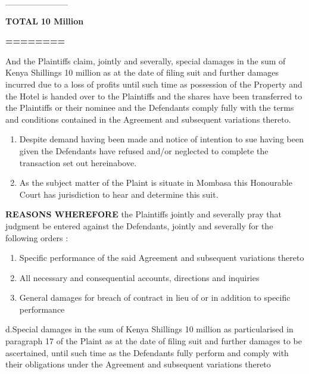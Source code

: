 \documentclass[12pt,a4paper]{article}
\begin{document}
\begin{justify}         \_\_\_\_\_\_\_\_\_\_\end{justify}


\begin{justify}\textbf{TOTAL}\textbf{          10 Million}\end{justify}


\begin{justify}\textbf{========}\end{justify}


\begin{justify}And the Plaintiffs claim, jointly and severally, special damages in the sum of Kenya Shillings 10 million as at the date of filing suit and further damages incurred due to a loss of profits until such time as possession of the Property and the Hotel is handed over to the Plaintiffs and the shares have been transferred to the Plaintiffs or their nominee and the Defendants comply fully with the terms and conditions contained in the Agreement and subsequent variations thereto.\end{justify}


\begin{enumerate}
\item Despite demand having been made and notice of intention to sue having been given the Defendants have refused and/or neglected to complete the transaction set out hereinabove.

\item As the subject matter of the Plaint is situate in Mombasa this Honourable Court has jurisdiction to hear and determine this suit.

\end{enumerate}
\begin{justify}\textbf{REASONS WHEREFORE }the Plaintiffs jointly and severally pray that judgment be entered against the Defendants, jointly and severally for the following orders :\end{justify}


\begin{enumerate}
\item Specific performance of the said Agreement and subsequent variations thereto

\item All necessary and consequential accounts, directions and inquiries

\item General damages for breach of contract in lieu of or in addition to specific performance

\end{enumerate}
\begin{justify}d.Special damages in the sum of Kenya Shillings 10 million as particularised in paragraph 17 of the Plaint as at the date of filing suit and further damages to be ascertained, until such time as the Defendants fully perform and comply with their obligations under the Agreement and subsequent variations thereto\end{justify}
\end{document}
